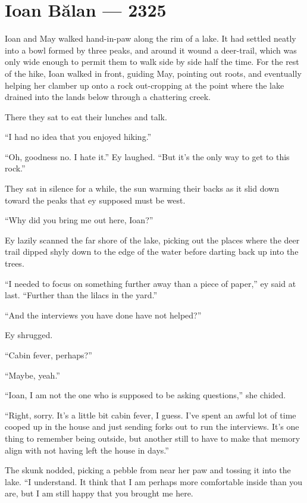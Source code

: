\hypertarget{ioan-bux103lan-2325}{%
\chapter{Ioan Bălan — 2325}\label{ioan-bux103lan-2325}}

Ioan and May walked hand-in-paw along the rim of a lake. It had settled neatly into a bowl formed by three peaks, and around it wound a deer-trail, which was only wide enough to permit them to walk side by side half the time. For the rest of the hike, Ioan walked in front, guiding May, pointing out roots, and eventually helping her clamber up onto a rock out-cropping at the point where the lake drained into the lands below through a chattering creek.

There they sat to eat their lunches and talk.

``I had no idea that you enjoyed hiking.''

``Oh, goodness no. I hate it.'' Ey laughed. ``But it's the only way to get to this rock.''

They sat in silence for a while, the sun warming their backs as it slid down toward the peaks that ey supposed must be west.

``Why did you bring me out here, Ioan?''

Ey lazily scanned the far shore of the lake, picking out the places where the deer trail dipped shyly down to the edge of the water before darting back up into the trees.

``I needed to focus on something further away than a piece of paper,'' ey said at last. ``Further than the lilacs in the yard.''

``And the interviews you have done have not helped?''

Ey shrugged.

``Cabin fever, perhaps?''

``Maybe, yeah.''

``Ioan, I am not the one who is supposed to be asking questions,'' she chided.

``Right, sorry. It's a little bit cabin fever, I guess. I've spent an awful lot of time cooped up in the house and just sending forks out to run the interviews. It's one thing to remember being outside, but another still to have to make that memory align with not having left the house in days.''

The skunk nodded, picking a pebble from near her paw and tossing it into the lake. ``I understand. It think that I am perhaps more comfortable inside than you are, but I am still happy that you brought me here.

